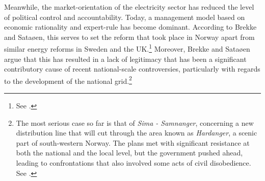 

Meanwhile, the market-orientation of the electricity sector has reduced the level of political control and accountability. Today, a management model based on economic rationality and expert-rule has become dominant. According to Brekke and Sataøen, this serves to set the reform that took place in Norway apart from similar energy reforms in Sweden and the UK.\footnote{See \cite{brekke12}.} Moreover, Brekke and Sataøen argue that this has resulted in a lack of legitimacy that has been a significant contributory cause of recent national-scale controversies, particularly with regards to the development of the national grid.\footnote{The most serious case so far is that of {\it Sima - Samnanger}, concerning a new distribution line that will cut through the area known as {\it Hardanger}, a scenic part of south-western Norway. The plans met with significant resistance at both the national and the local level, but the government pushed ahead, leading to confrontations that also involved some acts of civil disobedience. See \cite[22-23]{brekke12}.} %

